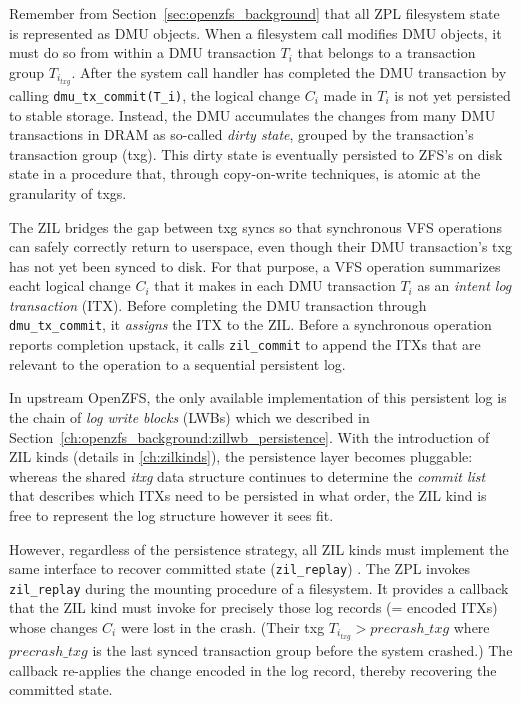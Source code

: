 \documentclass[12pt,a4paper,twoside]{book}
\begin{document}
Remember from Section~\ref{sec:openzfs_background} that all ZPL filesystem state is represented as DMU objects.
When a filesystem call modifies DMU objects, it must do so from within a DMU transaction $T_i$ that belongs to a transaction group $T_{i_{txg}}$.
After the system call handler has completed the DMU transaction by calling \lstinline{dmu_tx_commit(T_i)}, the logical change $C_i$ made in $T_i$ is not yet persisted to stable storage.
Instead, the DMU accumulates the changes from many DMU transactions in DRAM as so-called \textit{dirty state}, grouped by the transaction's transaction group (txg).
This dirty state is eventually persisted to ZFS's on disk state in a procedure that, through copy-on-write techniques, is atomic at the granularity of txgs.

The ZIL bridges the gap between txg syncs so that synchronous VFS operations can safely correctly return to userspace, even though their DMU transaction's txg has not yet been synced to disk.
For that purpose, a VFS operation summarizes eacht logical change $C_i$ that it makes in each DMU transaction $T_i$ as an \textit{intent log transaction} (ITX).
Before completing the DMU transaction through \lstinline{dmu_tx_commit}, it \textit{assigns} the ITX to the ZIL.
Before a synchronous operation reports completion upstack, it calls \lstinline{zil_commit} to append the ITXs that are relevant to the operation to a sequential persistent log.

In upstream OpenZFS, the only available implementation of this persistent log is the chain of \textit{log write blocks} (LWBs) which we described in Section~\ref{ch:openzfs_background:zillwb_persistence}.
With the introduction of ZIL kinds (details in \ref{ch:zilkinds}), the persistence layer becomes pluggable:
whereas the shared \textit{itxg} data structure continues to determine the \textit{commit list} that describes which ITXs need to be persisted in what order, the ZIL kind is free to represent the log structure however it sees fit.

However, regardless of the persistence strategy, all ZIL kinds must implement the same interface to recover committed state (\lstinline{zil_replay}) .
The ZPL invokes \lstinline{zil_replay} during the mounting procedure of a filesystem.
It provides a callback that the ZIL kind must invoke for precisely those log records (= encoded ITXs) whose changes $C_i$ were lost in the crash.
(Their txg $T_{i_{txg}} > precrash\_txg$ where $precrash\_txg$ is the last synced transaction group before the system crashed.)
The callback re-applies the change encoded in the log record, thereby recovering the committed state.
\end{document}

